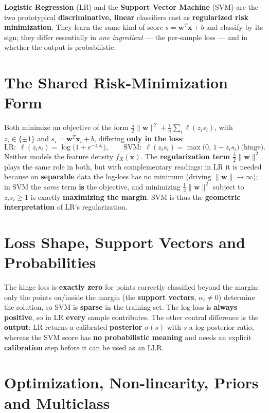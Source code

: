 \textbf{Logistic Regression} (LR) and the \textbf{Support Vector Machine} (SVM) are the two prototypical \textbf{discriminative, linear} classifiers cast as \textbf{regularized risk minimization}. They learn the same kind of score $s=\mathbf{w}^T\mathbf{x}+b$ and classify by its sign; they differ essentially in \emph{one ingredient} --- the per-sample loss --- and in whether the output is probabilistic.

\section*{The Shared Risk-Minimization Form}

Both minimize an objective of the form $\frac{\lambda}{2}\|\mathbf{w}\|^2+\frac1n\sum_i\ell(z_is_i)$, with $z_i\in\{\pm1\}$ and $s_i=\mathbf{w}^T\mathbf{x}_i+b$, differing \textbf{only in the loss}:
\[
\text{LR:}\ \ \ell(z_is_i)=\log\!\big(1+e^{-z_is_i}\big),\qquad
\text{SVM:}\ \ \ell(z_is_i)=\max\!\big(0,\,1-z_is_i\big)\ \text{(hinge)} .
\]
Neither models the feature density $f_X(\mathbf{x})$. The \textbf{regularization term} $\frac\lambda2\|\mathbf{w}\|^2$ plays the same role in both, but with complementary readings: in LR it is needed because on \textbf{separable} data the log-loss has no minimum (driving $\|\mathbf{w}\|\to\infty$); in SVM the \emph{same} term \textbf{is} the objective, and minimizing $\frac12\|\mathbf{w}\|^2$ subject to $z_is_i\ge1$ is exactly \textbf{maximizing the margin}. SVM is thus the \textbf{geometric interpretation} of LR's regularization.

\section*{Loss Shape, Support Vectors and Probabilities}

The hinge loss is \textbf{exactly zero} for points correctly classified beyond the margin: only the points on/inside the margin (the \textbf{support vectors}, $\alpha_i\ne0$) determine the solution, so SVM is \textbf{sparse} in the training set. The log-loss is \textbf{always positive}, so in LR \textbf{every} sample contributes. The other central difference is the \textbf{output}: LR returns a calibrated \textbf{posterior} $\sigma(s)$ with $s$ a log-posterior-ratio, whereas the SVM score has \textbf{no probabilistic meaning} and needs an explicit \textbf{calibration} step before it can be used as an LLR.

\section*{Optimization, Non-linearity, Priors and Multiclass}

